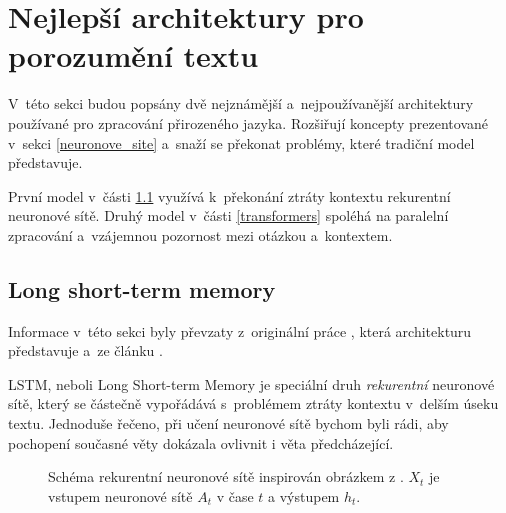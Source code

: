 \section{Nejlepší architektury pro porozumění textu}
V~této sekci budou popsány dvě nejznámější a~nejpoužívanější architektury používané pro zpracování přirozeného jazyka. Rozšiřují koncepty prezentované v~sekci \ref{neuronove_site} a~snaží se překonat problémy, které tradiční model představuje.\par
První model v~části \ref{lstm} využívá k~překonání ztráty kontextu rekurentní neuronové sítě. Druhý model v~části \ref{transformers} spoléhá na paralelní zpracování a~vzájemnou pozornost mezi otázkou a~kontextem.

\subsection{Long short-term memory}
\label{lstm}
Informace v~této sekci byly převzaty z~originální práce \cite{LSTM}, která architekturu představuje a~ze článku \cite{understandingLSTM}.\par
LSTM, neboli Long Short-term Memory je speciální druh \emph{rekurentní} neuronové sítě, který se částečně vypořádává s~problémem ztráty kontextu v~delším úseku textu. Jednoduše řečeno, při učení neuronové sítě bychom byli rádi, aby pochopení současné věty dokázala ovlivnit i věta předcházející.\par

\begin{figure}[hbt]
    \centering
	\caption{Schéma rekurentní neuronové sítě inspirován obrázkem z \cite{understandingLSTM}. $X_t$ je vstupem neuronové sítě $A_t$ v čase $t$ a výstupem $h_t$.}
	\label{RNN}
\end{figure}

